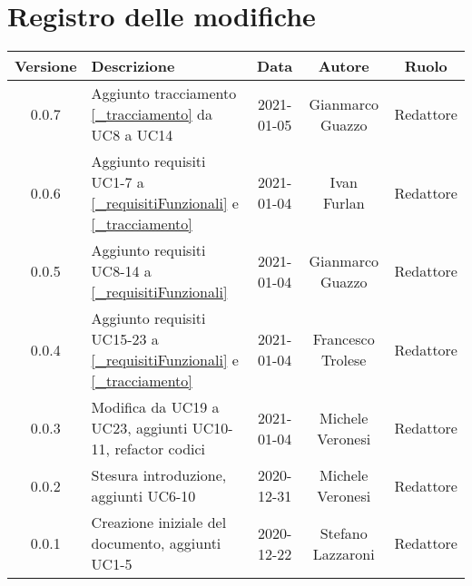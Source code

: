 \section*{Registro delle modifiche}

\begin{center}
	\begin{longtable}{|c|p{5cm}|c|c|c|}
	\hline
	\rowcolor{lighter-grayer}
	\textbf{Versione} & \textbf{Descrizione} & \textbf{Data} & \textbf{Autore} & \textbf{Ruolo} \\
	\hline
	\endfirsthead


	\hline
	0.0.7 & Aggiunto tracciamento \ref{_tracciamento} da UC8 a UC14 & 2021-01-05 & Gianmarco Guazzo & Redattore \\
	0.0.6 & Aggiunto requisiti UC1-7 a \ref{_requisitiFunzionali} e \ref{_tracciamento} & 2021-01-04 & Ivan Furlan & Redattore \\
	0.0.5 & Aggiunto requisiti UC8-14 a \ref{_requisitiFunzionali} & 2021-01-04 & Gianmarco Guazzo & Redattore \\
	0.0.4 & Aggiunto requisiti UC15-23 a \ref{_requisitiFunzionali} e \ref{_tracciamento} & 2021-01-04 & Francesco Trolese & Redattore \\
	0.0.3 & Modifica da UC19 a UC23, aggiunti UC10-11, refactor codici & 2021-01-04 & Michele Veronesi & Redattore \\
	0.0.2 & Stesura introduzione, aggiunti UC6-10 & 2020-12-31 & Michele Veronesi & Redattore\\
    0.0.1 & Creazione iniziale del documento, aggiunti UC1-5 & 2020-12-22 & Stefano Lazzaroni & Redattore\\
	\hline

	\end{longtable}
\end{center}